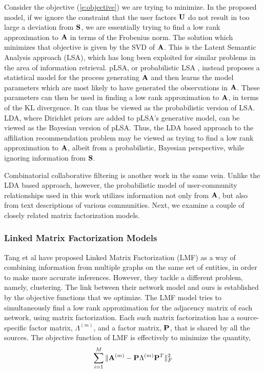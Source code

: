 Consider the objective (\ref{e:objective}) we are trying to minimize. In the proposed model, if we ignore the constraint that the user factors $\mathbf{U}$ do not result in too large a deviation from $\mathbf{S}$, we are essentially trying to find a low rank approximation to $\mathbf{A}$ in terms of the Frobenius norm. The solution which minimizes that objective is given by the SVD of $\mathbf{A}$. This is the Latent Semantic Analysis approach (LSA), which has long been exploited for similar problems in the area of information retrieval. pLSA, or probabilistic LSA \cite{HofmannPLSI}, instead proposes a statistical model for the process generating $\mathbf{A}$ and then learns the model parameters which are most likely to have generated the observations in $\mathbf{A}$. These parameters can then be used in finding a low rank approximation to $\mathbf{A}$, in terms of the KL divergence. It can thus be viewed as the probabilistic version of LSA. LDA, where Dirichlet priors are added to pLSA's generative model, can be viewed as the Bayesian version of pLSA. Thus, the LDA based approach to the affiliation recommendation problem may be viewed as trying to find a low rank approximation to $\mathbf{A}$, albeit from a probabilistic, Bayesian perspective, while ignoring information from $\mathbf{S}$.

Combinatorial collaborative filtering\cite{GoogleCCF} is another work in the same vein. Unlike the LDA based approach, however, the probabilistic model of user-community relationships used in this work utilizes information not only from $\mathbf{A}$, but also from text descriptions of various communities. Next, we examine a couple of closely related matrix factorization models.

\subsubsection{Linked Matrix Factorization Models}
Tang et al have proposed Linked Matrix Factorization (LMF) \cite{WeiLMF} as a way of combining information from multiple graphs on the same set of entities, in order to make more accurate inferences. However, they tackle a different problem, namely, clustering. The link between their network model and ours is established by the objective functions that we optimize. The LMF model tries to simultaneously find a low rank approximation for the adjacency matrix of each network, using matrix factorization. Each such matrix factorization has a source-specific factor matrix, $\Lambda^{(m)}$, and a factor matrix, $\mathbf{P}$, that is shared by all the sources. The objective function of LMF is effectively to minimize the quantity,
\begin{equation*}
\displaystyle\sum_{i=1}^{M}\|\mathbf{A}^{(m)} - \mathbf{P} \Lambda^{(m)} \mathbf{P}^T\|_{F}^2
\label{e:LMF}
\end{equation*}

